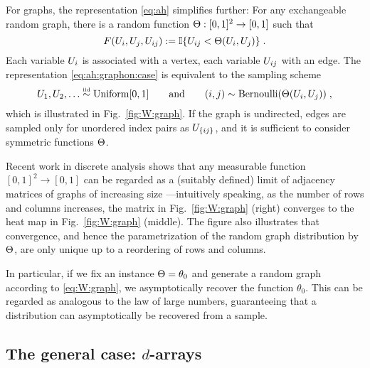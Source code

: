 For graphs, the representation \eqref{eq:ah} simplifies further:
For any exchangeable random graph, there is a random
function ${\Theta:[0,1]^2\rightarrow[0,1]}$ such that
\begin{equation}
  \label{eq:ah:graphon:case}
  F(U_i,U_j,U_{ij}):=\mathbb{I}\lbrace U_{ij} < \Theta(U_i,U_j)\rbrace\;.
\end{equation}
Each variable $U_i$ is associated with a vertex, each variable $U_{ij}$ with an edge. 
The representation \eqref{eq:ah:graphon:case} is equivalent to the sampling scheme
\begin{equation}
  \label{eq:W:graph}
  U_1,U_2,\dots\overset{\mbox{\tiny iid}}{\sim}\mbox{\rm Uniform}[0,1]\qquad\text{and}\qquad (i,j)\sim\mbox{\rm Bernoulli}(\Theta(U_i,U_j))\;,
\end{equation}
which is illustrated in Fig.~\ref{fig:W:graph}. If the graph is undirected, edges are sampled only for unordered index pairs as $U_{\lbrace ij\rbrace}$,
and it is sufficient to consider symmetric functions $\Theta$.

Recent work in discrete analysis shows that any
measurable function $[0,1]^2\rightarrow[0,1]$ can be regarded as a (suitably defined) limit of adjacency matrices
of graphs of increasing size \citep{Lovasz:Szegedy:2006}---intuitively speaking, 
as the number of rows and columns increases, the
matrix in Fig.~\ref{fig:W:graph} (right) converges to the heat map in Fig.~\ref{fig:W:graph} (middle).
The figure also illustrates that convergence, and hence the parametrization of the random graph distribution
by $\Theta$, are only unique up to a reordering of rows and columns.

In particular, if we fix an instance ${\Theta=\theta_0}$ and generate a random graph according to \eqref{eq:W:graph},
we asymptotically recover the function $\theta_0$. This can be regarded as analogous to the law of large
numbers, guaranteeing that a distribution can asymptotically be recovered from a sample.


\subsection{The general case: $d$-arrays}

